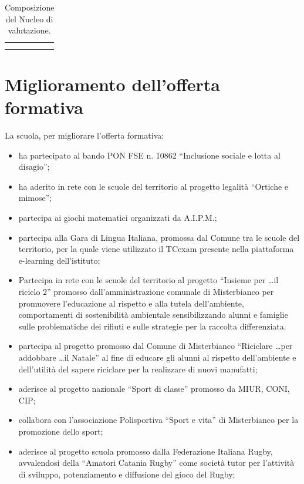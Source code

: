 \documentclass[12pt,a4paper,oneside]{memoir}
\begin{document}
\begin{table}[htp]
\caption{Composizione del Nucleo di valutazione.} \label{composizione-niv}
\footnotesize
\begin{tabular}{|>{\raggedright}p{6.277cm}|>{\raggedright\arraybackslash}p{6.277cm}|}
\hline
&\\\hline
&\\\hline
&\\\hline
\end{tabular}
\end{table}

\chapter{Miglioramento dell'offerta formativa}
La scuola, per migliorare l'offerta formativa:
\begin{itemize}
    \item ha partecipato al bando PON FSE n. 10862 ``Inclusione sociale e lotta al disagio''; 
    \item ha aderito in rete con le scuole del territorio al progetto legalità ``Ortiche e mimose'';
    \item partecipa ai giochi matematici organizzati da A.I.P.M.;
    \item partecipa alla Gara di Lingua Italiana, promossa dal Comune tra le scuole del territorio, per la quale viene utilizzato il TCexam presente nella piattaforma e-learning dell'istituto;
    \item Partecipa in rete con le scuole del territorio al progetto ``Insieme per \ldots il riciclo 2'' promosso  dall'amministrazione comunale di Misterbianco per promuovere l'educazione al rispetto e alla tutela dell'ambiente, comportamenti di sostenibilità ambientale sensibilizzando alunni e famiglie sulle problematiche dei rifiuti e sulle strategie per la raccolta differenziata.
    \item partecipa al progetto promosso dal Comune di Misterbianco  ``Riciclare \ldots per addobbare \ldots il Natale'' al fine di educare gli alunni al rispetto dell'ambiente e dell'utilità del sapere riciclare per la realizzare di nuovi manufatti;
    \item aderisce al progetto nazionale ``Sport di classe'' promosso da MIUR, CONI, CIP;
    \item collabora con l'associazione Polisportiva ``Sport e vita'' di Misterbianco per la promozione dello sport;
    \item aderisce al progetto scuola promosso dalla Federazione Italiana Rugby, avvalendosi della ``Amatori Catania Rugby'' come società tutor per l'attività di sviluppo, potenziamento e diffusione del gioco del Rugby;

\end{itemize}
\end{document}
